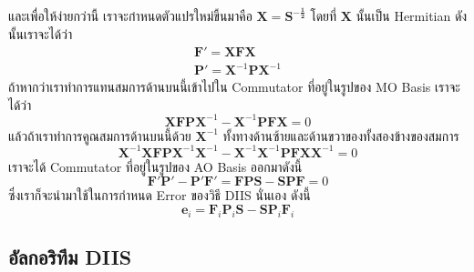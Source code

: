 %
และเพื่อให้ง่ายกว่านี้ เราจะกำหนดตัวแปรใหม่ขึ้นมาคือ $\mathbf{X} = \mathbf{S^{-\frac{1}{2}}}$ โดยที่ $\mathbf{X}$ นั้นเป็น Hermitian ดังนั้นเราจะได้ว่า
%
\begin{gather}
  \mathbf{F'} = \mathbf{X} \mathbf{F} \mathbf{X} \\
  \mathbf{P'} = \mathbf{X}^{-1} \mathbf{P} \mathbf{X}^{-1}
\end{gather}
%
ถ้าหากว่าเราทำการแทนสมการด้านบนนี้เข้าไปใน Commutator ที่อยู่ในรูปของ MO Basis เราจะได้ว่า
%
\begin{equation}
  \mathbf{X} \mathbf{F} \mathbf{P} \mathbf{X}^{-1} - \mathbf{X}^{-1} \mathbf{P} \mathbf{F} \mathbf{X}
  =
  0
\end{equation}
%
แล้วถ้าเราทำการคูณสมการด้านบนนี้ด้วย $\mathbf{X}^{-1}$ ทั้งทางด้านซ้ายและด้านขวาของทั้งสองข้างของสมการ
%
\begin{equation}
  \mathbf{X}^{-1} \mathbf{X} \mathbf{F} \mathbf{P} \mathbf{X}^{-1} \mathbf{X}^{-1}
  -
  \mathbf{X}^{-1} \mathbf{X}^{-1} \mathbf{P} \mathbf{F} \mathbf{X} \mathbf{X}^{-1}
  =
  0
\end{equation}
%
เราจะได้ Commutator ที่อยู่ในรูปของ AO Basis ออกมาดังนี้
%
\begin{equation}
  \mathbf{F'}\mathbf{P'} - \mathbf{P'}\mathbf{F'}
  =
  \mathbf{F} \mathbf{P} \mathbf{S} - \mathbf{S} \mathbf{P} \mathbf{F}
  =
  0
\end{equation}
%
ซึ่งเราก็จะนำมาใช้ในการกำหนด Error ของวิธี DIIS นั่นเอง ดังนี้
%
\begin{equation}
  \label{eq:diis_error_hf}
  \mathbf{e}_i
  =
  \mathbf{F}_i \mathbf{P}_i \mathbf{S} - \mathbf{S} \mathbf{P}_i \mathbf{F}_i
\end{equation}

\subsection{อัลกอริทึม DIIS}


